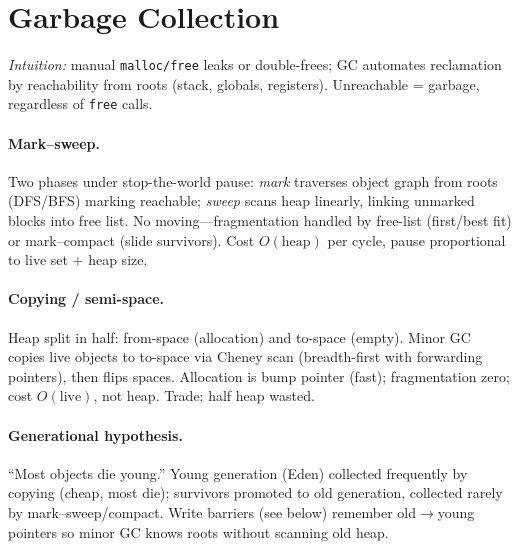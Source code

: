 \section{Garbage Collection}
\label{sec:gc}
\emph{Intuition:} manual \texttt{malloc/free} leaks or double-frees; GC automates reclamation by reachability from roots (stack, globals, registers). Unreachable = garbage, regardless of \texttt{free} calls.

\paragraph{Mark--sweep.} Two phases under stop-the-world pause: \emph{mark} traverses object graph from roots (DFS/BFS) marking reachable; \emph{sweep} scans heap linearly, linking unmarked blocks into free list. No moving---fragmentation handled by free-list (first/best fit) or mark--compact (slide survivors). Cost $O(\text{heap})$ per cycle, pause proportional to live set + heap size.

\paragraph{Copying / semi-space.} Heap split in half: from-space (allocation) and to-space (empty). Minor GC copies live objects to to-space via Cheney scan (breadth-first with forwarding pointers), then flips spaces. Allocation is bump pointer (fast); fragmentation zero; cost $O(\text{live})$, not heap. Trade: half heap wasted.

\paragraph{Generational hypothesis.} ``Most objects die young.'' Young generation (Eden) collected frequently by copying (cheap, most die); survivors promoted to old generation, collected rarely by mark--sweep/compact. Write barriers (see below) remember old$\to$young pointers so minor GC knows roots without scanning old heap.

